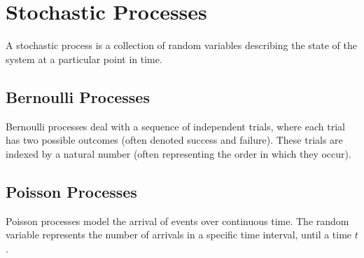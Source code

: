 \section{Stochastic Processes}

A stochastic process is a collection of random variables describing the state of the system at a particular point in time.

\subsection{Bernoulli Processes}

Bernoulli processes deal with a sequence of independent trials, where each trial has two possible outcomes (often denoted success and failure).  These trials are indexed by a natural number (often representing the order in which they occur).


\subsection{Poisson Processes}

Poisson processes model the arrival of events over continuous time. The random variable represents the number of arrivals in a specific time interval, until a time $t$.

